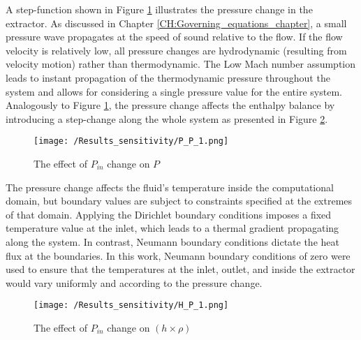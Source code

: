 \documentclass[../Article_Sensitivity_Analsysis.tex]{subfiles}
\begin{document}
	
	
	A step-function shown in Figure \ref{fig:Sensitivty_P_P} illustrates the pressure change in the extractor. As discussed in Chapter \ref{CH:Governing_equations_chapter}, a small pressure wave propagates at the speed of sound relative to the flow. If the flow velocity is relatively low, all pressure changes are hydrodynamic (resulting from velocity motion) rather than thermodynamic. The Low Mach number assumption leads to instant propagation of the thermodynamic pressure throughout the system and allows for considering a single pressure value for the entire system. Analogously to Figure \ref{fig:Sensitivty_P_P}, the pressure change affects the enthalpy balance by introducing a step-change along the whole system as presented in Figure \ref{fig:Sensitivty_P_H}.
	
	\begin{figure}[h!]
		\centering
		\texttt{[image: /Results\_sensitivity/P\_P\_1.png]}
		\caption{The effect of $P_{in}$ change on $P$}
		\label{fig:Sensitivty_P_P}
	\end{figure}
	
	The pressure change affects the fluid's temperature inside the computational domain, but boundary values are subject to constraints specified at the extremes of that domain. Applying the Dirichlet boundary conditions imposes a fixed temperature value at the inlet, which leads to a thermal gradient propagating along the system. In contrast, Neumann boundary conditions dictate the heat flux at the boundaries. In this work, Neumann boundary conditions of zero were used to ensure that the temperatures at the inlet, outlet, and inside the extractor would vary uniformly and according to the pressure change.
	
	\begin{figure}[h!]
		\centering
		\texttt{[image: /Results\_sensitivity/H\_P\_1.png]}
		\caption{The effect of $P_{in}$ change on $(h \times \rho)$}
		\label{fig:Sensitivty_P_H}
	\end{figure}
	
\end{document}
